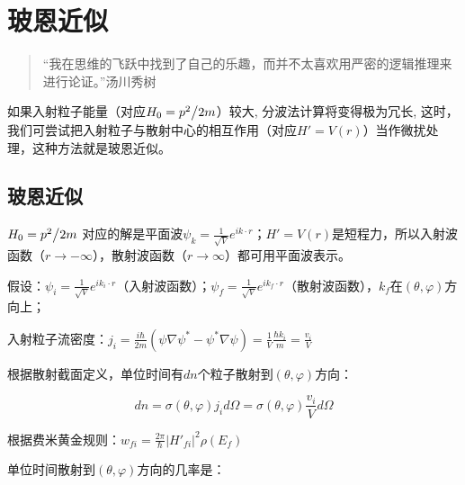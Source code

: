 \section{玻恩近似}


\begin{quotation}
“我在思维的飞跃中找到了自己的乐趣，而并不太喜欢用严密的逻辑推理来进行论证。”\qquad 汤川秀树
\end{quotation}



如果入射粒子能量（对应$H_0  = {{p^2 } \mathord{\left/
 {\vphantom {{p^2 } {2m}}} \right.
 \kern-\nulldelimiterspace} {2m}}$）较大, 分波法计算将变得极为冗长, 这时，我们可尝试把入射粒子与散射中心的相互作用（对应$H' = V(r)$）当作微扰处理，这种方法就是玻恩近似。


\subsection{玻恩近似}


$H_0  = {{p^2 } \mathord{\left/
 {\vphantom {{p^2 } {2m}}} \right.
 \kern-\nulldelimiterspace} {2m}}$
对应的解是平面波$\psi _k  = \frac{1}{{\sqrt V }}e^{ik \cdot r} $；$H' = V(r)$是短程力，所以入射波函数（$r \to  - \infty $），散射波函数（$r \to \infty $）都可用平面波表示。

假设：$\psi _i  = \frac{1}{{\sqrt V }}e^{ik_i  \cdot r} $（入射波函数）；$\psi _f  = \frac{1}{{\sqrt V }}e^{ik_f  \cdot r} $（散射波函数），$k_f$在$\left( {\theta ,\varphi } \right)$方向上；


入射粒子流密度：$j_i  = \frac{{i\hbar }}{{2m}}\left( {\psi \nabla \psi ^*  - \psi ^* \nabla \psi } \right) = \frac{1}{V}\frac{{\hbar k_i }}{m} = \frac{{v_i }}{V}$

根据散射截面定义，单位时间有$dn$个粒子散射到$\left( {\theta ,\varphi } \right)$方向：

\begin{equation}\label{27-1}
dn = \sigma \left( {\theta ,\varphi } \right)j_i d\Omega  = \sigma \left( {\theta ,\varphi } \right)\frac{{v_i }}{V}d\Omega
\end{equation}



根据费米黄金规则：$w_{fi}  = \frac{{2\pi }}{\hbar }\left| {H'_{fi} } \right|^2 \rho (E_f )$


单位时间散射到$\left( {\theta ,\varphi } \right)$方向的几率是：


